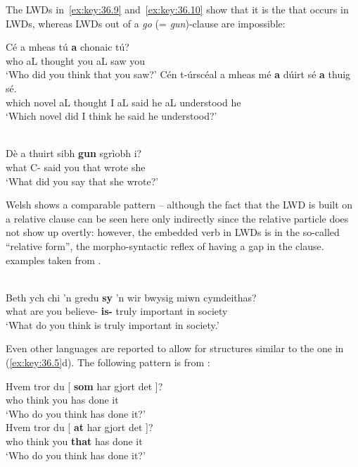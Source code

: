 \documentclass[output=paper]{langsci/langscibook}
\begin{document}
The \glspl{LWD} in~\eqref{ex:key:36.9} and~\eqref{ex:key:36.10} show that it is the \Rci{}
that occurs in \glspl{LWD}, whereas \glspl{LWD} out of a \emph{go} (= \emph{gun})-clause are
impossible:

\ea\label{ex:key:36.9} 
    \ea
        \gll Cé   a  mheas    tú   \textbf{a}  chonaic  tú? \\
             who   aL   thought  you   aL  saw   you \\
        \glt ‘Who did you think that you saw?’
    \ex
        \gll Cén  t-úrscéal  a   mheas  mé  \textbf{a}   dúirt  sé  \textbf{a}   thuig  sé. \\
             which  novel       aL   thought I  aL   said  he  aL understood he \\
        \glt ‘Which novel did I think he said he understood?’
    \z
\z

\ea\label{ex:key:36.10} \\
        \gll    \llap{*}Dè      a      thuirt sibh     \textbf{gun}   sgrìobh i?   \\
        what  C-\Rel{} said you       that   wrote she\\
        \glt    ‘What did you say that she wrote?’
\z

Welsh shows a comparable pattern -- although the fact that the \gls{LWD} is built on
a relative clause can be seen here only indirectly since the relative particle
does not show up overtly: however, the embedded verb in \glspl{LWD} is in the
so-called \enquote{relative form}, the morpho-syntactic reflex of having a gap in the
clause.  examples taken from \citet[555]{Willis2000}.

\ea\label{ex:key:36.11} \\
    \gll Beth ych chi ’n gredu \textbf{sy} ’n wir bwysig miwn cymdeithas?\\
         what are you \Prog{} believe-\Vn{} \textbf{is-\Rel} \Pred{} truly important in society\\
    \glt ‘What do you think is truly important in society.’
\z

Even other  languages are reported to allow for structures similar to
the one in (\ref{ex:key:36.5}d). The following pattern is from 
\parencite{WesVanLoh2012}:

\ea {}
    \ea
        \gll    Hvem tror du [ \textbf{som} \underline{\hphantom{2em}} har gjort det ]?\\
        who  think  you {} \Rci{} {} has  done  it \\
        \glt    ‘Who do you think has done it?’ \\
    \ex
        \gll    Hvem  tror  du [ \textbf{at} \underline{\hphantom{2em}} har   gjort  det ]?  \\
        who  think  you {} \textbf{that} {} has  done  it \\
        \glt    ‘Who do you think has done it?’
    \z
\z
\end{document}
